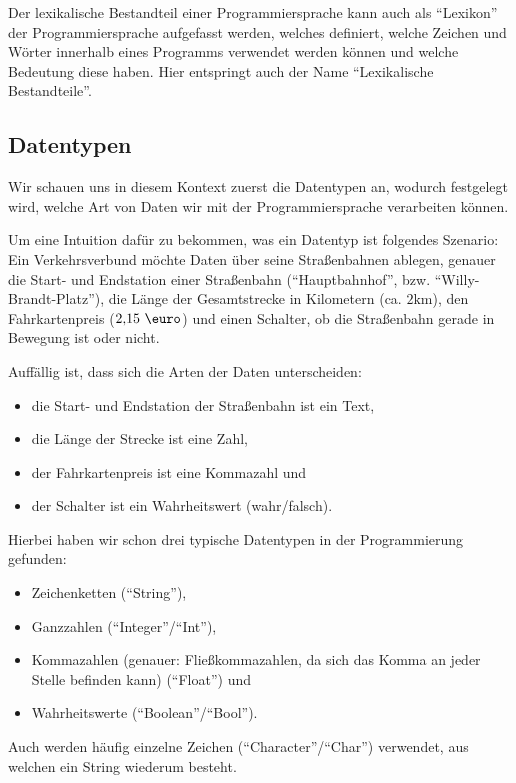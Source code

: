Der lexikalische Bestandteil einer Programmiersprache kann auch als \enquote{Lexikon} der Programmiersprache aufgefasst werden, welches definiert, welche Zeichen und Wörter innerhalb eines Programms verwendet werden können und welche Bedeutung diese haben. Hier entspringt auch der Name \enquote{Lexikalische Bestandteile}.

\subsection{Datentypen} \functionalMark \imperativeMark \oopMark

	Wir schauen uns in diesem Kontext zuerst die Datentypen an, wodurch festgelegt wird, welche Art von Daten wir mit der Programmiersprache verarbeiten können.
	
	Um eine Intuition dafür zu bekommen, was ein Datentyp ist folgendes Szenario:
	Ein Verkehrsverbund möchte Daten über seine Straßenbahnen ablegen, genauer die Start- und Endstation einer Straßenbahn (\enquote{Hauptbahnhof}, bzw. \enquote{Willy-Brandt-Platz}), die Länge der Gesamtstrecke in Kilometern (ca. $ 2\text{km} $), den Fahrkartenpreis ($ 2,\!15\text{ \euro} $) und einen Schalter, ob die Straßenbahn gerade in Bewegung ist oder nicht.
	
	Auffällig ist, dass sich die Arten der Daten unterscheiden:
	\begin{itemize}
		\item die Start- und Endstation der Straßenbahn ist ein Text,
		\item die Länge der Strecke ist eine Zahl,
		\item der Fahrkartenpreis ist eine Kommazahl und
		\item der Schalter ist ein Wahrheitswert (wahr/falsch).
	\end{itemize}
	Hierbei haben wir schon drei typische Datentypen in der Programmierung gefunden:
	\begin{itemize}
		\item Zeichenketten (\enquote{String}),
		\item Ganzzahlen (\enquote{Integer}/\enquote{Int}),
		\item Kommazahlen (genauer: Fließkommazahlen, da sich das Komma an jeder Stelle befinden kann) (\enquote{Float}) und
		\item Wahrheitswerte (\enquote{Boolean}/\enquote{Bool}).
	\end{itemize}
	Auch werden häufig einzelne Zeichen (\enquote{Character}/\enquote{Char}) verwendet, aus welchen ein String wiederum besteht.
	
